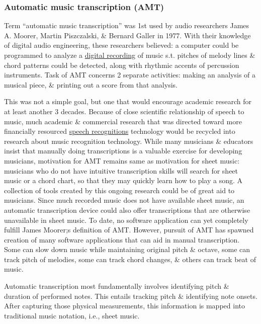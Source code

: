 \documentclass{article}
\begin{document}
\subsubsection{Automatic music transcription (AMT)}
Term ``automatic music transcription'' was 1st used by audio researchers {\sc James A. Moorer,  Martin Piszczalski, \& Bernard Galler} in 1977. With their knowledge of digital audio engineering, these researchers believed: a computer could be programmed to analyze a \href{https://en.wikipedia.org/wiki/Digital_recording}{digital recording} of music s.t. pitches of melody lines \& chord patterns could be detected, along with rhythmic accents of percussion instruments. Task of AMT concerns 2 separate activities: making an analysis of a musical piece, \& printing out a score from that analysis.

This was not a simple goal, but one that would encourage academic research for at least another 3 decades. Because of close scientific relationship of speech to music, much academic \& commercial research that was directed toward more financially resourced \href{https://en.wikipedia.org/wiki/Speech_recognition}{speech recognitions} technology would be recycled into research about music recognition technology. While many musicians \& educators insist that manually doing transcriptions is a valuable exercise for developing musicians, motivation for AMT remains same as motivation for sheet music: musicians who do not have intuitive transcription skills will search for sheet music or a chord chart, so that they may quickly learn how to play a song. A collection of tools created by this ongoing research could be of great aid to musicians. Since much recorded music does not have available sheet music, an automatic transcription device could also offer transcriptions that are otherwise unavailable in sheet music. To date, no software application can yet completely fulfill {\sc James Moorer};s definition of AMT. However, pursuit of AMT has spawned creation of many software applications that can aid in manual transcription. Some can slow down music while maintaining original pitch \& octave, some can track pitch of melodies, some can track chord changes, \& others can track beat of music.

Automatic transcription most fundamentally involves identifying pitch \& duration of performed notes. This entails tracking pitch \& identifying note onsets. After capturing those physical measurements, this information is mapped into traditional music notation, i.e., sheet music.
\end{document}
